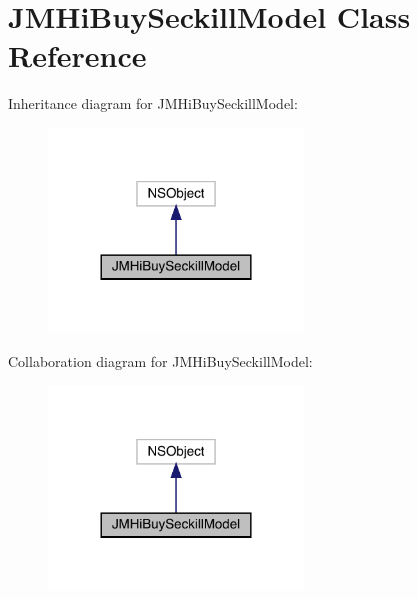 \hypertarget{interface_j_m_hi_buy_seckill_model}{}\section{J\+M\+Hi\+Buy\+Seckill\+Model Class Reference}
\label{interface_j_m_hi_buy_seckill_model}


Inheritance diagram for J\+M\+Hi\+Buy\+Seckill\+Model\+:\nopagebreak
\begin{figure}[H]
\begin{center}
\leavevmode
\includegraphics[width=192pt]{interface_j_m_hi_buy_seckill_model__inherit__graph}
\end{center}
\end{figure}


Collaboration diagram for J\+M\+Hi\+Buy\+Seckill\+Model\+:\nopagebreak
\begin{figure}[H]
\begin{center}
\leavevmode
\includegraphics[width=192pt]{interface_j_m_hi_buy_seckill_model__coll__graph}
\end{center}
\end{figure}
